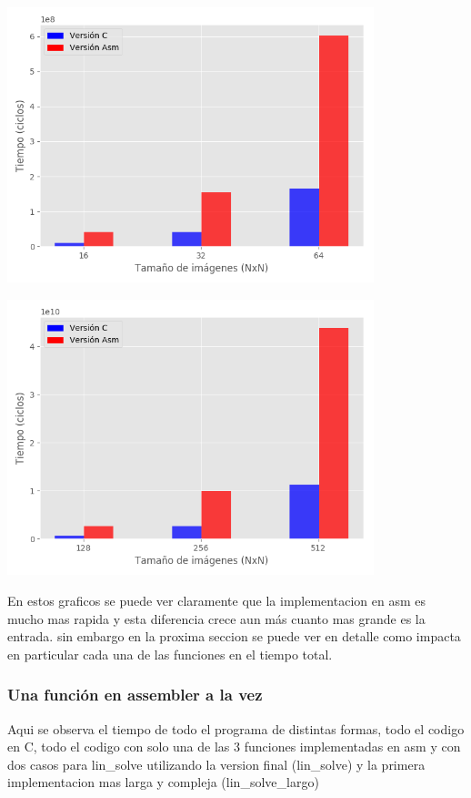 \begin{center}
\includegraphics[width=0.8\textwidth]{imagenes/CvsAsm16-64.png}
\end{center}

\begin{center}
\includegraphics[width=0.8\textwidth]{imagenes/CvsAsm128-512.png}
\end{center}

En estos graficos se puede ver claramente que la implementacion en asm es mucho mas rapida y esta diferencia
crece aun más cuanto mas grande es la entrada. sin embargo en la proxima seccion se puede ver
en detalle como impacta en particular cada una de las funciones en el tiempo total.



\subsubsection{Una función en assembler a la vez}
Aqui se observa el tiempo de todo el programa de distintas formas, todo el codigo en C,
todo el codigo con solo una de las 3 funciones implementadas en asm y con dos casos para lin_solve
utilizando la version final (lin_solve) y la primera implementacion mas larga y compleja (lin_solve_largo)

